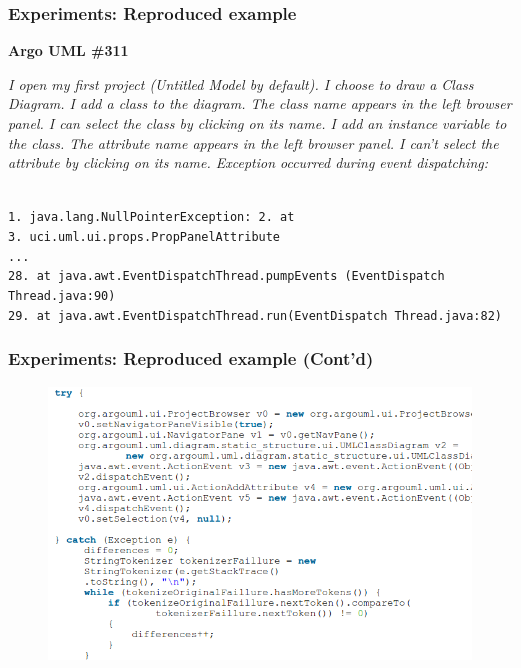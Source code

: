 \documentclass{beamer}
\begin{document}
\begin{frame}
\frametitle{Experiments: Reproduced example}

\textbf{Argo UML \#311}

\vspace{0.4cm} 
\textit{I open my first project (Untitled Model by default). I choose
to draw a Class Diagram. I add a class to the diagram. The
class name appears in the left browser panel. I can select the
class by clicking on its name. I add an instance variable to the
class. The attribute name appears in the left browser panel. I
can't select the attribute by clicking on its name. Exception
occurred during event dispatching:}


\vspace{0.4cm} 

\begin{small}
\texttt{
\\ 1. java.lang.NullPointerException:
2. at \\
3. uci.uml.ui.props.PropPanelAttribute \\
... \\
28. at java.awt.EventDispatchThread.pumpEvents 
(EventDispatch Thread.java:90)\\
29. at java.awt.EventDispatchThread.run(EventDispatch
Thread.java:82)}

\end{small}


\end{frame}

\begin{frame}
\frametitle{Experiments: Reproduced example (Cont'd)}
\begin{figure}
\includegraphics[width=0.97\linewidth]{media/testing2.png}
\end{figure}

\end{frame}
\end{document}
